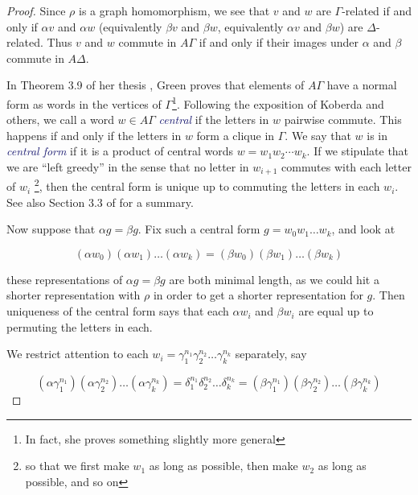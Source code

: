 \documentclass[microtype]{gtpart}
\theoremstyle{definition}
\theoremstyle{theorem}
\newcommand*{\important}[1]{\textcolor{MidnightBlue}{\emph{#1}}}
\begin{document}
\begin{proof}
    Since $\rho$ is a graph
    homomorphism, we see that $v$ and $w$ are $\Gamma$-related if and only if $\alpha v$
    and $\alpha w$ (equivalently $\beta v$ and $\beta w$, equivalently $\alpha v$ and $\beta w$) 
    are $\Delta$-related. Thus $v$ and $w$ commute in $A \Gamma$ if and only 
    if their images under $\alpha$ and $\beta$ commute in $A \Delta$.

    In Theorem 3.9 of her thesis \cite{greenGraphProductsGroups1990}, 
    Green proves that elements of $A \Gamma$ have a normal form as words 
    in the vertices of $\Gamma$\footnote{In fact, she proves something slightly more general}.
    Following the exposition of Koberda \cite{koberdaRightangledArtinGroups2012} 
    and others, we call a word $w \in A \Gamma$ \important{central} if the 
    letters in $w$ pairwise commute. This happens if and only if the letters 
    in $w$ form a clique in $\Gamma$. We say that $w$ is in 
    \important{central form} if it is a product of central words 
    $w = w_1 w_2 \cdots w_k$. If we stipulate that we are ``left greedy'' 
    in the sense that no letter in $w_{i+1}$ commutes with each letter of $w_i$%
    \footnote{so that we first make $w_1$ as long as possible, then make $w_2$ as long as possible, and so on},
    then the central form is unique up to commuting the letters in each $w_i$.
    See also Section 3.3 of \cite{charneyIntroductionRightangledArtin2007} for a summary.

    Now suppose that $\alpha g = \beta g$. Fix such a central form
    $g = w_0 w_1 \ldots w_k$, and look at 

    \[ (\alpha w_0) (\alpha w_1) \ldots (\alpha w_k) = (\beta w_0) (\beta w_1) \ldots (\beta w_k) \]

    these representations of $\alpha g = \beta g$ are both minimal length, as 
    we could hit a shorter representation with $\rho$ in order to get a 
    shorter representation for $g$. Then uniqueness of the central form
    says that each $\alpha w_i$ and $\beta w_i$ are equal up to permuting the 
    letters in each. 
    
    We restrict attention to each 
    $w_i = \gamma_1^{n_1} \gamma_2^{n_2} \ldots \gamma_k^{n_k}$ separately, say

    \[ 
    (\alpha \gamma_1^{n_1}) (\alpha \gamma_2^{n_2}) \ldots (\alpha \gamma_k^{n_k}) = 
    \delta_1^{n_1} \delta_2^{n_2} \ldots \delta_k^{n_k} =
    (\beta \gamma_1^{n_1}) (\beta \gamma_2^{n_2}) \ldots (\beta \gamma_k^{n_k})
    \]


\end{proof}
\end{document}
